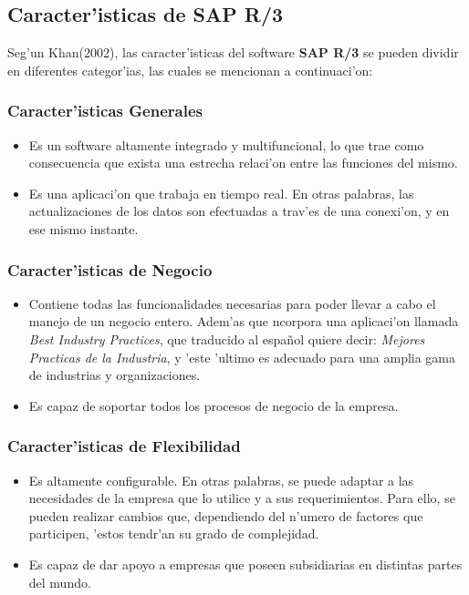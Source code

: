 \subsection{Caracter'isticas de SAP R/3}
Seg'un Khan(2002), las caracter'isticas del software \textbf{SAP R/3} se pueden dividir en diferentes categor'ias, las cuales se mencionan a continuaci'on:

\subsubsection*{Caracter'isticas Generales}
\begin{itemize}
\item Es un software altamente integrado y multifuncional, lo que trae como consecuencia que exista una estrecha relaci'on entre las funciones del mismo.
\item Es una aplicaci'on que trabaja en tiempo real. En otras palabras, las actualizaciones de los datos son efectuadas a trav'es de una conexi'on, y en ese mismo instante.
\end{itemize}
\subsubsection*{Caracter'isticas de Negocio}
\begin{itemize}
\item Contiene todas las funcionalidades necesarias para poder llevar a cabo el manejo de un negocio entero. Adem'as que ncorpora una aplicaci'on llamada \textit{Best Industry Practices}, que traducido al espa\~nol quiere decir: \textit{Mejores Practicas de la Industria}, y 'este 'ultimo es adecuado para una amplia gama de industrias y organizaciones.
\item Es capaz de soportar todos los procesos de negocio de la empresa.
\end{itemize}

\subsubsection*{Caracter'isticas de Flexibilidad}
\begin{itemize}
\item Es altamente configurable. En otras palabras, se puede adaptar a las necesidades de la empresa que lo utilice y a sus requerimientos. Para ello, se pueden realizar cambios que, dependiendo del n'umero de factores que participen, 'estos tendr'an su grado de complejidad.
\item Es capaz de dar apoyo a empresas que poseen subsidiarias en distintas partes del mundo.
\end{itemize}

